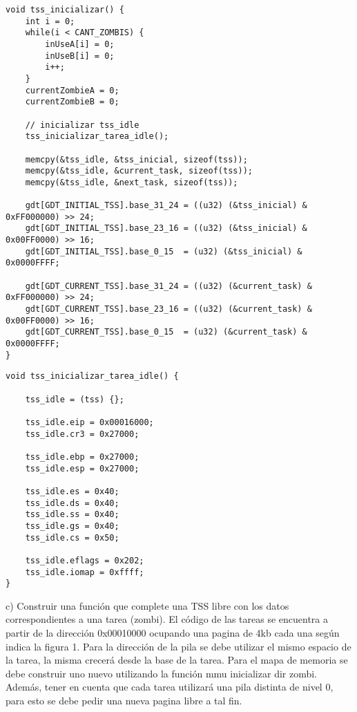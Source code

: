 \documentclass[a4paper]{article}
\begin{document}
\begin{codesnippet}
\begin{verbatim}
void tss_inicializar() {
    int i = 0;
    while(i < CANT_ZOMBIS) {
        inUseA[i] = 0;
        inUseB[i] = 0;
        i++;
    }
    currentZombieA = 0;
    currentZombieB = 0;

    // inicializar tss_idle
    tss_inicializar_tarea_idle();

    memcpy(&tss_idle, &tss_inicial, sizeof(tss));
    memcpy(&tss_idle, &current_task, sizeof(tss));
    memcpy(&tss_idle, &next_task, sizeof(tss));

    gdt[GDT_INITIAL_TSS].base_31_24 = ((u32) (&tss_inicial) & 0xFF000000) >> 24;
    gdt[GDT_INITIAL_TSS].base_23_16 = ((u32) (&tss_inicial) & 0x00FF0000) >> 16;
    gdt[GDT_INITIAL_TSS].base_0_15  = (u32) (&tss_inicial) & 0x0000FFFF;

    gdt[GDT_CURRENT_TSS].base_31_24 = ((u32) (&current_task) & 0xFF000000) >> 24;
    gdt[GDT_CURRENT_TSS].base_23_16 = ((u32) (&current_task) & 0x00FF0000) >> 16;
    gdt[GDT_CURRENT_TSS].base_0_15  = (u32) (&current_task) & 0x0000FFFF;
}
\end{verbatim}
\end{codesnippet}


\begin{codesnippet}
\begin{verbatim}
void tss_inicializar_tarea_idle() {

    tss_idle = (tss) {};

    tss_idle.eip = 0x00016000;
    tss_idle.cr3 = 0x27000;
    
    tss_idle.ebp = 0x27000;
    tss_idle.esp = 0x27000;

    tss_idle.es = 0x40;
    tss_idle.ds = 0x40;
    tss_idle.ss = 0x40;
    tss_idle.gs = 0x40;
    tss_idle.cs = 0x50;

    tss_idle.eflags = 0x202;
    tss_idle.iomap = 0xffff;
}
\end{verbatim}
\end{codesnippet}

{\large c)} Construir una funci\'on que complete una TSS libre con los datos correspondientes a una
tarea (zombi). El c\'odigo de las tareas se encuentra a partir de la direcci\'on 0x00010000
ocupando una pagina de 4kb cada una seg\'un indica la figura 1. Para la direcci\'on de la
pila se debe utilizar el mismo espacio de la tarea, la misma crecer\'a desde la base de la tarea. Para el mapa de memoria se debe construir uno nuevo utilizando la funci\'on mmu inicializar dir zombi. Adem\'as, tener en cuenta que cada tarea utilizar\'a una pila distinta de nivel 0, para esto se debe pedir una nueva pagina libre a tal fin. \\
\end{document}

